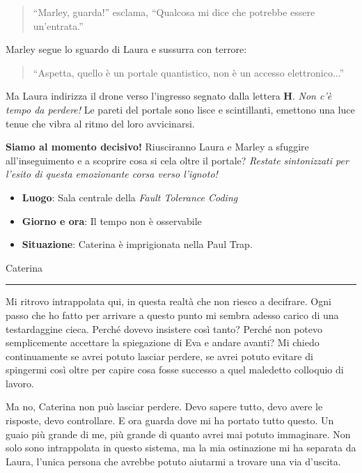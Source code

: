 \begin{quote}
\enquote{Marley, guarda!} esclama, \enquote{Qualcosa mi dice che potrebbe essere un'entrata.}
\end{quote}

Marley segue lo sguardo di Laura e sussurra con terrore:

\begin{quote}
\enquote{Aspetta, quello è un portale quantistico, non è un accesso elettronico...}
\end{quote}

Ma Laura indirizza il drone verso l'ingresso segnato dalla lettera \textbf{H}. \emph{Non c'è tempo da perdere!} Le pareti del portale sono lisce e scintillanti, emettono una luce tenue che vibra al ritmo del loro avvicinarsi.

\textbf{Siamo al momento decisivo!} Riusciranno Laura e Marley a sfuggire all'inseguimento e a scoprire cosa si cela oltre il portale? \emph{Restate sintonizzati per l'esito di questa emozionante corsa verso l'ignoto!}

\begin{tcolorbox}[colback=gray!5,colframe=gray!80,title=\textbf{Scheda Informativa}]
\begin{itemize}
    \item \textbf{Luogo}: Sala centrale della \emph{Fault Tolerance Coding}
    \item \textbf{Giorno e ora}: Il tempo non è osservabile
    \item \textbf{Situazione}: Caterina è imprigionata nella Paul Trap.
\end{itemize}
\end{tcolorbox}

\vspace{1em}
\begin{center}Caterina\end{center}
\hrule
\vspace{1em}

Mi ritrovo intrappolata qui, in questa realtà che non riesco a decifrare. Ogni passo che ho fatto per arrivare a questo punto mi sembra adesso carico di una testardaggine cieca. Perché dovevo insistere così tanto? Perché non potevo semplicemente accettare la spiegazione di Eva e andare avanti? Mi chiedo continuamente se avrei potuto lasciar perdere, se avrei potuto evitare di spingermi così oltre per capire cosa fosse successo a quel maledetto colloquio di lavoro.

Ma no, Caterina non può lasciar perdere. Devo sapere tutto, devo avere le risposte, devo controllare. E ora guarda dove mi ha portato tutto questo. Un guaio più grande di me, più grande di quanto avrei mai potuto immaginare. Non solo sono intrappolata in questo sistema, ma la mia ostinazione mi ha separata da Laura, l’unica persona che avrebbe potuto aiutarmi a trovare una via d’uscita.

